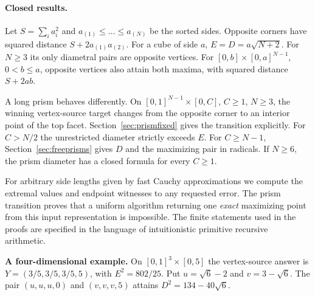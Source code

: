 \documentclass[10pt,letterpaper]{article}
\begin{document}
\paragraph{Closed results.}
Let $S=\sum_i a_i^2$ and $a_{(1)}\le\dots\le a_{(N)}$ be the sorted sides. Opposite corners have squared distance $S+2a_{(1)}a_{(2)}$. For a cube of side $a$, $E=D=a\sqrt{N+2}$. For $N\ge3$ its only diametral pairs are opposite vertices. For $[0,b]\times[0,a]^{N-1}$, $0<b\le a$, opposite vertices also attain both maxima, with squared distance $S+2ab$.
\par A long prism behaves differently. On $[0,1]^{N-1}\times[0,C]$, $C\ge1$, $N\ge3$, the winning vertex-source target changes from the opposite corner to an interior point of the top facet. Section~\ref{sec:prismfixed} gives the transition explicitly. For $C>N/2$ the unrestricted diameter strictly exceeds $E$. For $C\ge N-1$, Section~\ref{sec:freeprisms} gives $D$ and the maximizing pair in radicals. If $N\ge6$, the prism diameter has a closed formula for every $C\ge1$.
\par\smallskip
For arbitrary side lengths given by fast Cauchy approximations we compute the extremal values and endpoint witnesses to any requested error. The prism transition proves that a uniform algorithm returning one \emph{exact} maximizing point from this input representation is impossible. The finite statements used in the proofs are specified in the language of intuitionistic primitive recursive arithmetic.

\medskip
\noindent\colorbox{teal!5}{\parbox{.965\linewidth}{\small
\textbf{A four-dimensional example.} On $[0,1]^3\times[0,5]$ the vertex-source answer is $Y=(3/5,3/5,3/5,5)$, with $E^2=802/25$. Put $u=\sqrt6-2$ and $v=3-\sqrt6$. The pair $(u,u,u,0)$ and $(v,v,v,5)$ attains $D^2=134-40\sqrt6$.}}
\clearpage
\end{document}
